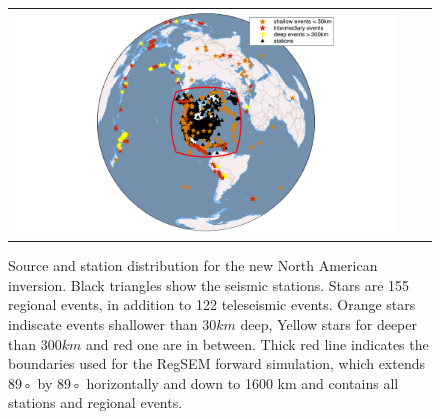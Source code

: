 \documentclass[12pt]{article}
\begin{document}
	\begin{figure}
		\centering
		\begin{tabular}{ccc}
			\includegraphics[width=1\textwidth]{figures/map_events_stn_global.png}
		\end{tabular}

		\caption{\baselineskip 18pt 
		Source and station distribution for the new North American inversion. Black triangles show the seismic stations. Stars are 155 regional events, in addition to 122 teleseismic events. Orange stars indiscate events shallower than $30km$ deep, Yellow stars for deeper than $300km$ and red one are in between. Thick red line indicates the boundaries used for the RegSEM forward simulation, which extends 89◦ by 89◦ horizontally and down to 1600 km and contains all stations and regional events.}

		\label{map_evt_stn}
	\end{figure}
\end{document}
